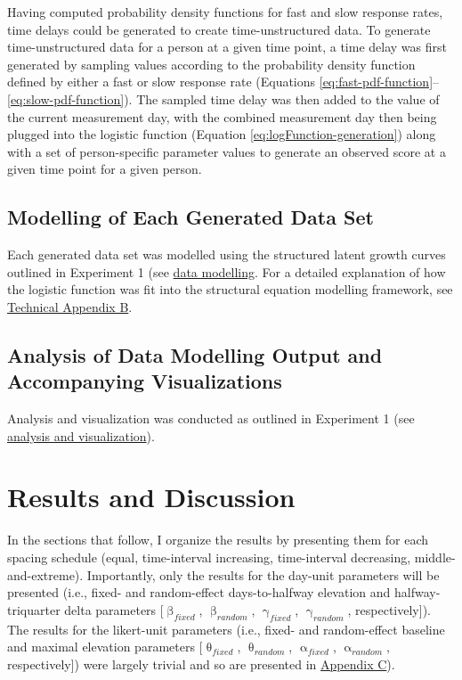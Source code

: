 \documentclass[
12pt, %
twoside,
english]{guelphthesis}
\theoremstyle{definition}
\theoremstyle{definition}
\theoremstyle{definition}
\theoremstyle{definition}
\theoremstyle{remark}
\begin{document}
Having computed probability density functions for fast and slow response rates, time delays could be generated to create time-unstructured data. To generate time-unstructured data for a person at a given time point, a time delay was first
generated by sampling values according to the probability density function defined by either a fast or slow response rate (Equations \ref{eq:fast-pdf-function}--\ref{eq:slow-pdf-function}). The sampled time delay was then added to the value of the current measurement day, with the combined measurement day then being plugged into the logistic function (Equation \ref{eq:logFunction-generation}) along with a set of person-specific parameter values to generate an observed score at a given time point for a given person.

\hypertarget{data-modelling-exp3}{%
\subsection{Modelling of Each Generated Data Set}\label{data-modelling-exp3}}

Each generated data set was modelled using the structured latent growth curves outlined in Experiment 1 (see \protect\hyperlink{data-modelling}{data modelling}. For a detailed explanation of how the logistic function was fit into the structural equation modelling framework, see \protect\hyperlink{structured-latent}{Technical Appendix B}.

\hypertarget{analysis-of-data-modelling-output-and-accompanying-visualizations-1}{%
\subsection{Analysis of Data Modelling Output and Accompanying Visualizations}\label{analysis-of-data-modelling-output-and-accompanying-visualizations-1}}

Analysis and visualization was conducted as outlined in Experiment 1 (see \protect\hyperlink{analysis-visualization}{analysis and visualization}).

\hypertarget{results-and-discussion-2}{%
\section{Results and Discussion}\label{results-and-discussion-2}}

In the sections that follow, I organize the results by presenting them for each spacing schedule (equal, time-interval increasing, time-interval decreasing, middle-and-extreme). Importantly, only the results for the day-unit parameters will be presented (i.e., fixed- and random-effect days-to-halfway elevation and halfway-triquarter delta parameters {[}\(\upbeta_{fixed}\), \(\upbeta_{random}\), \(\upgamma_{fixed}\), \(\upgamma_{random}\), respectively{]}). The results for the likert-unit parameters (i.e., fixed- and random-effect baseline and maximal elevation parameters {[}\(\uptheta_{fixed}\), \(\uptheta_{random}\), \(\upalpha_{fixed}\), \(\upalpha_{random}\), respectively{]}) were largely trivial and so are presented in \protect\hyperlink{appendix-c}{Appendix C}).
\end{document}
